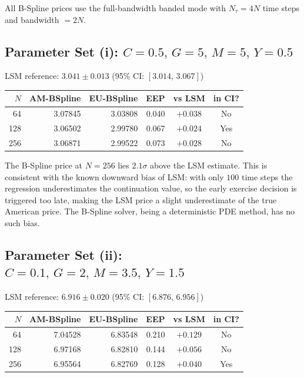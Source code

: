 \documentclass[11pt,a4paper]{article}
\begin{document}
All B-Spline prices use the full-bandwidth banded mode with $N_\tau = 4N$ time
steps and bandwidth $= 2N$.

\subsection{Parameter Set (i): $C=0.5,\,G=5,\,M=5,\,Y=0.5$}

LSM reference: $3.041 \pm 0.013$ \quad (95\% CI: $[3.014,\,3.067]$)
\begin{center}
\begin{tabular}{rrrrcc}
\toprule
$N$ & AM-BSpline & EU-BSpline & EEP & vs LSM & in CI? \\
\midrule
 64 & 3.07845 & 3.03808 & 0.040 & $+0.038$ & No \\
128 & 3.06502 & 2.99780 & 0.067 & $+0.024$ & Yes \\
256 & 3.06871 & 2.99522 & 0.073 & $+0.028$ & No \\
\bottomrule
\end{tabular}
\end{center}

\noindent The B-Spline price at $N=256$ lies $2.1\sigma$ above the LSM estimate.
This is consistent with the known downward bias of LSM: with only $100$ time
steps the regression underestimates the continuation value, so the early
exercise decision is triggered too late, making the LSM price a slight
underestimate of the true American price.  The B-Spline solver, being a
deterministic PDE method, has no such bias.

\subsection{Parameter Set (ii): $C=0.1,\,G=2,\,M=3.5,\,Y=1.5$}

LSM reference: $6.916 \pm 0.020$ \quad (95\% CI: $[6.876,\,6.956]$)
\begin{center}
\begin{tabular}{rrrrcc}
\toprule
$N$ & AM-BSpline & EU-BSpline & EEP & vs LSM & in CI? \\
\midrule
 64 & 7.04528 & 6.83548 & 0.210 & $+0.129$ & No \\
128 & 6.97168 & 6.82810 & 0.144 & $+0.056$ & No \\
256 & 6.95564 & 6.82769 & 0.128 & $+0.040$ & Yes \\
\bottomrule
\end{tabular}
\end{center}
\end{document}
